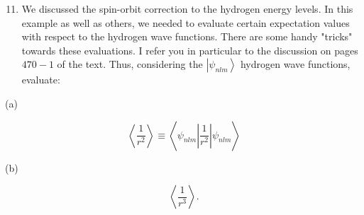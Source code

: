 \documentclass[12pt]{article}
\begin{document}
\begin{enumerate}
  \setcounter{enumi}{10}
  \item We discussed the spin-orbit correction to the hydrogen energy levels. In this example as well as others, we needed to evaluate certain expectation values with respect to the hydrogen wave functions. There are some handy "tricks" towards these evaluations. I refer you in particular to the discussion on pages $470-1$ of the text. Thus, considering the $\left|\psi_{n l m}\right\rangle$ hydrogen wave functions, evaluate:
\end{enumerate}

(a)

$$
\left\langle\frac{1}{r^{2}}\right\rangle \equiv\left\langle\psi_{n l m}\left|\frac{1}{r^{2}}\right| \psi_{n l m}\right\rangle
$$

(b)

$$
\left\langle\frac{1}{r^{3}}\right\rangle .
$$
\end{document}
